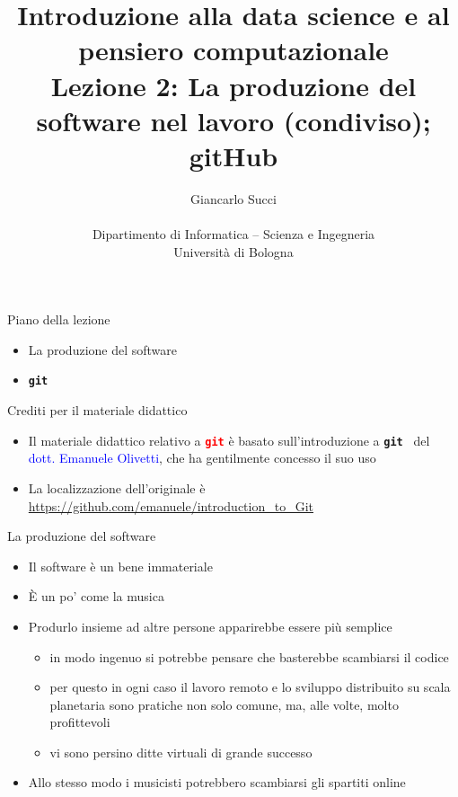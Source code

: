 \documentclass{beamer}
\title[L02]{Introduzione alla data science e al pensiero computazionale\\
Lezione 2: La produzione del software nel lavoro (condiviso); gitHub} %
\author[{\tiny Giancarlo Succi }]{Giancarlo Succi\\\\ Dipartimento di Informatica -- Scienza e Ingegneria\\Universit\`{a} di Bologna\\
\bftt{g.succi@unibo.it}
} %
\institute[unibo] %
\date{} %
\newcommand{\git}{\texttt{\textbf{git}}\xspace}
\begin{document}
\begin{frame}
\titlepage %

\end{frame}




\begin{frame}
{\centerline{Piano della lezione}}
\begin{itemize}
    \item La produzione del software
    \item \git
\end{itemize} 
\end{frame}

\begin{frame}
{\centerline{Crediti per il materiale didattico}}
\begin{itemize}
    \item Il materiale didattico relativo a \textcolor{red}{\git} \`{e} basato sull'introduzione a \git ~ del \textcolor{blue}{dott. Emanuele Olivetti}, che ha gentilmente concesso il suo uso
    \item La localizzazione dell'originale \`{e} \url{https://github.com/emanuele/introduction_to_Git}
\end{itemize} 
\end{frame}


\begin{frame}
{\centerline{La produzione del software}}
\begin{itemize}
    \item Il software \`{e} un bene immateriale
    \item \`{E} un po' come la musica
    \item Produrlo insieme ad altre persone apparirebbe essere pi\`{u} semplice
    \begin{itemize}
    \item in modo ingenuo si potrebbe pensare che basterebbe scambiarsi il codice
    \item per questo in ogni caso il lavoro remoto e lo sviluppo distribuito su scala planetaria sono pratiche non solo comune, ma, alle volte, molto profittevoli
    \item vi sono persino ditte virtuali di grande successo
\end{itemize} 
\item Allo stesso modo i musicisti potrebbero scambiarsi gli spartiti online
\end{itemize} 
\end{frame}
\end{document}
